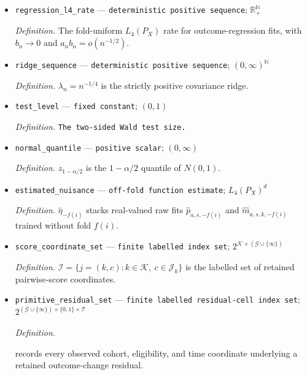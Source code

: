 \documentclass{article}
\begin{document}
\begin{itemize}
  \item \texttt{regression\_\allowbreak{}l4\_\allowbreak{}rate} --- \texttt{deterministic positive sequence}; \(\mathbb R_+^{\mathbb N}\)
  \par\smallskip\noindent\emph{Definition.} The fold-uniform \(L_4(P_X)\) rate for outcome-regression fits, with \(b_n\to0\) and \(a_nb_n=o(n^{-1/2})\).
  \item \texttt{ridge\_\allowbreak{}sequence} --- \texttt{deterministic positive sequence}; \((0,\infty)^{\mathbb N}\)
  \par\smallskip\noindent\emph{Definition.} \(\lambda_n=n^{-1/4}\) is the strictly positive covariance ridge.
  \item \texttt{test\_\allowbreak{}level} --- \texttt{fixed constant}; \((0,1)\)
  \par\smallskip\noindent\emph{Definition.} \texttt{The two-\allowbreak{}sided Wald test size.}
  \item \texttt{normal\_\allowbreak{}quantile} --- \texttt{positive scalar}; \((0,\infty)\)
  \par\smallskip\noindent\emph{Definition.} \(z_{1-\alpha/2}\) is the \(1-\alpha/2\) quantile of \(N(0,1)\).
  \item \texttt{estimated\_\allowbreak{}nuisance} --- \texttt{off-\allowbreak{}fold function estimate}; \(L_4(P_X)^d\)
  \par\smallskip\noindent\emph{Definition.} \(\widehat\eta_{-f(i)}\) stacks real-valued raw fits \(\widehat p_{a,s,-f(i)}\) and \(\widehat m_{a,s,k,-f(i)}\) trained without fold \(f(i)\).
  \item \texttt{score\_\allowbreak{}coordinate\_\allowbreak{}set} --- \texttt{finite labelled index set}; \(2^{\mathcal K\times(\mathcal G\cup\{\infty\})}\)
  \par\smallskip\noindent\emph{Definition.} \(\mathcal I=\{j=(k,c):k\in\mathcal K,\ c\in\mathcal J_k\}\) is the labelled set of retained pairwise-score coordinates.
  \item \texttt{primitive\_\allowbreak{}residual\_\allowbreak{}set} --- \texttt{finite labelled residual-\allowbreak{}cell index set}; \(2^{(\mathcal G\cup\{\infty\})\times\{0,1\}\times\mathcal T}\)
  \par\smallskip\noindent\emph{Definition.} \leavevmode\par\noindent {}\par\noindent records every observed cohort, eligibility, and time coordinate underlying a retained outcome-change residual.

\end{itemize}
\end{document}
